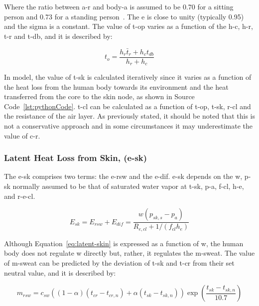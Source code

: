 Where the ratio between \ac{a-r} and \ac{body-a} is assumed to be 0.70 for a sitting person and 0.73 for a standing person~\cite{Fanger1967}.
The \ac{e} is close to unity (typically 0.95) and the \ac{sigma} is a constant.
The value of \ac{t-op} varies as a function of the \ac{h-c}, \ac{h-r}, \ac{t-r} and \ac{t-db}, and it is described by:

\begin{equation}
    t_{o}=\frac{h_{r} \bar{t}_{r}+h_{c} t_{db}}{h_{r}+h_{c}}\label{eq:t-op}
\end{equation}

In  model, the value of \ac{t-sk} is calculated iteratively since it varies as a function of the heat loss from the human body towards its environment and the heat transferred from the core to the skin node, as shown in Source Code~\ref{lst:pythonCode}.
\Ac{t-cl} can be calculated as a function of \ac{t-op}, \ac{t-sk}, \ac{r-cl} and the resistance of the air layer.
As previously stated, it should be noted that this is not a conservative approach and in some circumstances it may underestimate the value of \ac{c-r}.

\subsubsection{Latent Heat Loss from Skin, (\acs{e-sk})}

The \acf{e-sk} comprises two terms: the \ac{e-rsw} and the \ac{e-dif}.
\ac{e-sk} depends on the \ac{w}, \ac{p-sk} normally assumed to be that of saturated water vapor at \ac{t-sk}, \ac{p-a}, \ac{f-cl}, \ac{h-e}, and \ac{r-e-cl}.

\begin{equation}
    E_{s k}=E_{rsw}+E_{dif}=\frac{w\left(p_{s k, s}-p_{a}\right)}{R_{e, c l}+1 /\left(f_{c l} h_{e}\right)}\label{eq:latent-skin}
\end{equation}

Although Equation~\ref{eq:latent-skin} is expressed as a function of \ac{w}, the human body does not regulate \ac{w} directly but, rather, it regulates the \ac{m-sweat}.
The value of \ac{m-sweat} can be predicted by the deviation of \ac{t-sk} and \ac{t-cr} from their set neutral value, and it is described by:

\begin{equation}
    m_{rsw}=c_{sw}((1 - \alpha) (t_{cr} - t_{cr,n}) + \alpha (t_{sk} - t_{sk,n})) \exp (\frac{t_{sk}-t_{sk,n}}{10.7})\label{eq:regulatory-sweating}
\end{equation}

